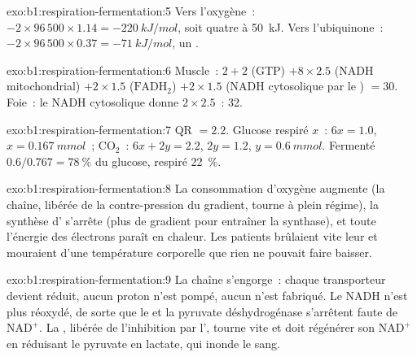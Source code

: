 \begin{solution}{exo:b1:respiration-fermentation:5}
Vers l'oxygène~: $-2\times 96\,500\times 1.14 = \qty{-220}{kJ/mol}$,
soit quatre  à \qty{50}{kJ}. Vers l'ubiquinone~: $-2\times 96\,500\times 0.37 =
\qty{-71}{kJ/mol}$, un .
\end{solution}

\begin{solution}{exo:b1:respiration-fermentation:6}
Muscle~: $2 + 2$ (GTP) $+ 8\times 2.5$ (NADH mitochondrial) $+ 2\times
1.5$ ($\mathrm{FADH_2}$) $+ 2\times 1.5$ (NADH cytosolique par le ) $=
30$. Foie~: le NADH cytosolique donne $2\times 2.5$~: 32.
\end{solution}

\begin{solution}{exo:b1:respiration-fermentation:7}
QR $= 2.2$. Glucose respiré $x$~: $6x = 1.0$, $x = \qty{0.167}{mmol}$~;
$\mathrm{CO_2}$~: $6x + 2y = 2.2$, $2y = 1.2$, $y = \qty{0.6}{mmol}$.
Fermenté $0.6/0.767 = \qty{78}{\%}$ du glucose, respiré \qty{22}{\%}.
\end{solution}

\begin{solution}{exo:b1:respiration-fermentation:8}
La consommation d'oxygène augmente (la chaîne, libérée de la
contre-pression du gradient, tourne à plein régime), la synthèse d'
s'arrête (plus de gradient pour entraîner la synthase), et toute
l'énergie des électrons paraît en chaleur. Les patients brûlaient vite
leur  et mouraient d'une température corporelle que rien ne
pouvait faire baisser.
\end{solution}

\begin{solution}{exo:b1:respiration-fermentation:9}
La chaîne s'engorge~: chaque transporteur devient réduit, aucun proton
n'est pompé, aucun  n'est fabriqué. Le NADH n'est plus réoxydé, de
sorte que le  et la pyruvate déshydrogénase s'arrêtent
faute de $\mathrm{NAD^+}$. La , libérée de l'inhibition par
l', tourne vite et doit régénérer son $\mathrm{NAD^+}$ en réduisant
le pyruvate en lactate, qui inonde le sang.
\end{solution}

